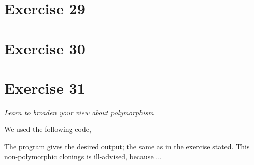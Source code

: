 \documentclass[12pt]{article}
\newcommand{\desc}[1]{\textit{#1} \vspace{1em}}
\begin{document}
\clearpage

\section*{Exercise 29}
\desc{}

\clearpage

\section*{Exercise 30}
\desc{}

\clearpage

\section*{Exercise 31}
\desc{Learn to broaden your view about polymorphism}

We used the following code,







The program gives the desired output; the same as in the exercise stated.
This non-polymorphic clonings is ill-advised, because ...

\clearpage
\end{document}
